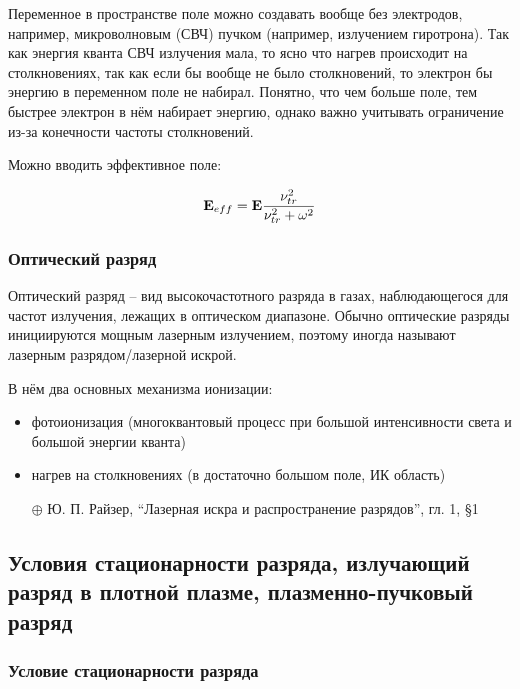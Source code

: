 \documentclass[10pt, a4paper]{article}
\begin{document}
Переменное в пространстве поле можно создавать вообще без электродов, например, микроволновым (СВЧ) пучком (например, излучением гиротрона). Так как энергия кванта СВЧ излучения мала, то ясно что нагрев происходит на столкновениях, так как если бы вообще не было столкновений, то электрон бы энергию в переменном поле не набирал. Понятно, что чем больше поле, тем быстрее электрон в нём набирает энергию, однако важно учитывать ограничение из-за конечности частоты столкновений.

Можно вводить эффективное поле: 

\begin{equation*}
	\vb{E}_{eff} = \vb{E} \frac{\nu_{tr}^{2}}{\nu_{tr}^2+\omega^2}
\end{equation*}

\subsubsection{Оптический разряд}

Оптический разряд -- вид высокочастотного разряда в газах, наблюдающегося для частот излучения, лежащих в оптическом диапазоне. Обычно оптические разряды инициируются мощным лазерным излучением, поэтому иногда называют лазерным разрядом/лазерной искрой.

В нём два основных механизма ионизации: 

\begin{itemize}
	
	\item фотоионизация (многоквантовый процесс при большой интенсивности света и большой энергии кванта)
	
	\item нагрев на столкновениях (в достаточно большом поле, ИК область)
	
\end{itemize}

\begin{itemize}
	\item[$\oplus$] Ю. П. Райзер, ``Лазерная искра и распространение разрядов'', гл. 1, \S 1
\end{itemize}

\subsection{Условия стационарности разряда, излучающий разряд в плотной плазме, плазменно-пучковый разряд}

\subsubsection{Условие стационарности разряда}
\end{document}
